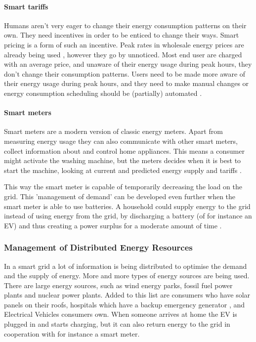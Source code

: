 \paragraph{Smart tariffs}
Humans aren’t very eager to change their energy consumption patterns on their own. They need incentives in order to be enticed to change their ways. Smart pricing is a form of such an incentive. Peak rates in wholesale energy prices are already being used \cite{SamadiMohsenian-RadSchoberEtAl2012}, however they go by unnoticed. Most end user are charged with an average price, and unaware of their energy usage during peak hours, they don’t change their consumption patterns. Users need to be made more aware of their energy usage during peak hours, and they need to make manual changes \cite{Mohsenian-RadLeon-Garcia2010} or energy consumption scheduling should be (partially) automated \cite{SamadiMohsenian-RadSchoberEtAl2012}.

\paragraph{Smart meters}
Smart meters are a modern version of classic energy meters. Apart from measuring energy usage they can also communicate with other smart meters, collect information about and control home appliances. This means a consumer might activate the washing machine, but the meters decides when it is best to start the machine, looking at current and predicted energy supply and tariffs  \cite{DepuruWangDevabhaktuni2011a}. 

This way the smart meter is capable of temporarily decreasing the load on the grid. This 'management of demand' can be developed even further when the smart meter is able to use batteries. A household could supply energy to the grid instead of using energy from the grid, by discharging a battery (of for instance an EV) and thus creating a power surplus for a moderate amount of time \cite{MwasiluJustoKimEtAl2014}. 

\subsubsection{Management of Distributed Energy Resources}
In a smart grid a lot of information is being distributed to optimise the demand and the supply of energy. More and more types of energy sources are being used. There are large energy sources, such as wind energy parks, fossil fuel power plants and nuclear power plants. Added to this list are consumers who have solar panels on their roofs, hospitals which have a backup emergency generator \cite{Kumagai2012}, and Electrical Vehicles consumers own. When someone arrives at home the EV is plugged in and starts charging, but it can also return energy to the grid in cooperation with for instance a smart meter.


